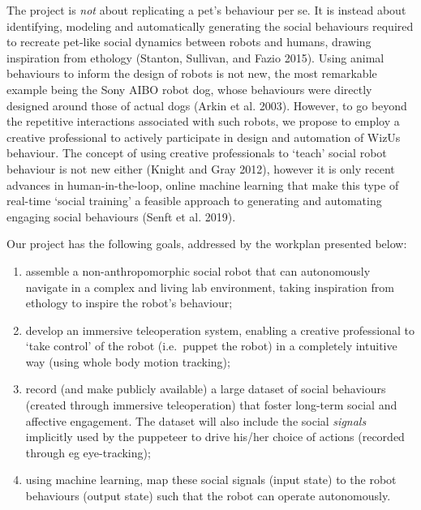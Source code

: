 \documentclass[11pt,a4paper]{report}
\newcommand{\project}{WizUs\xspace}
\begin{document}
The project is \emph{not} about replicating a pet's behaviour per se. It
is instead about identifying, modeling and automatically generating the
social behaviours required to recreate pet-like social dynamics between
robots and humans, drawing inspiration from ethology (Stanton, Sullivan,
and Fazio 2015). Using animal behaviours to inform the design of robots
is not new, the most remarkable example being the Sony AIBO robot dog,
whose behaviours were directly designed around those of actual dogs
(Arkin et al. 2003). However, to go beyond the repetitive interactions
associated with such robots, we propose to employ a creative
professional to actively participate in design and automation of \project
behaviour. The concept of using creative professionals to `teach' social
robot behaviour is not new either (Knight and Gray 2012), however it is
only recent advances in human-in-the-loop, online machine learning that
make this type of real-time `social training' a feasible approach to
generating and automating engaging social behaviours (Senft et al.
2019).

Our project has the following goals, addressed by the workplan presented
below:

\begin{enumerate}
\def\labelenumi{\arabic{enumi}.}
\item
  assemble a non-anthropomorphic social robot that can autonomously
  navigate in a complex and living lab environment, taking inspiration
  from ethology to inspire the robot's behaviour;
\item
  develop an immersive teleoperation system, enabling a creative
  professional to `take control' of the robot (i.e.~puppet the robot) in
  a completely intuitive way (using whole body motion tracking);
\item
  record (and make publicly available) a large dataset of social
  behaviours (created through immersive teleoperation) that foster
  long-term social and affective engagement. The dataset will also
  include the social \emph{signals} implicitly used by the puppeteer to
  drive his/her choice of actions (recorded through eg eye-tracking);
\item
  using machine learning, map these social signals (input state) to the
  robot behaviours (output state) such that the robot can operate
  autonomously.
\end{enumerate}
\end{document}

